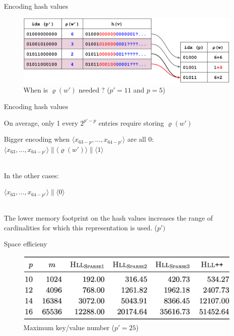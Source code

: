 \documentclass{beamer}
\begin{document}
\begin{frame}{Encoding hash values}
  \begin{figure}[c]
    \includegraphics[scale=0.4]{encoding_hash.png}
    \caption{When is $\varrho(w\prime)$ needed ? ($p' = 11$ and $p = 5$)}
  \end{figure}
\end{frame}

\begin{frame}{Encoding hash values}

  On average, only 1 every $2^{p\prime - p} $ entries require storing $\varrho(w\prime)$

  Bigger encoding when $\langle x_{63-p}, \dots, x_{64-p\prime} \rangle$ are all 0:
  ~\\
  \colorbox{light-gray}{$\langle x_{63}, \dots, x_{64-p\prime} \rangle \| \langle \varrho (w\prime) \rangle \| \langle 1 \rangle $}

  ~\\
  In the other cases:

  \colorbox{light-gray}{$\langle x_{63}, \dots, x_{64-p\prime} \rangle \| \langle 0 \rangle $}

  ~\\
  The lower memory footprint on the hash values increases the range of cardinalities for which this representation is used. ($p\prime)$

\end{frame}



\begin{frame}{Space efficieny}
  
  \begin{figure}[c]
    \includegraphics [scale=0.45]  {sparse_all.png}
    \caption{Maximum key/value number ($p' = 25$)}
  \end{figure}
\end{frame}
\end{document}
